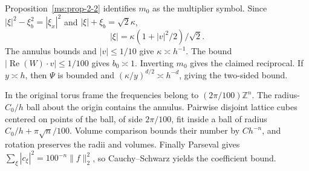 Proposition~\ref{ms:prop-2-2} identifies $m_0$ as the multiplier symbol. Since $|\xi|^2-\xi_b^2=|\xi_x|^2$ and $|\xi|+\xi_b=\sqrt2\kappa$,
\[
 |\xi|=\kappa(1+|v|^2/2)/\sqrt2 .
\]
The annulus bounds and $|v|\le1/10$ give $\kappa\asymp h^{-1}$. The bound $|\operatorname{Re}(W)\cdot v|\le1/100$ gives $b_0\asymp1$. Inverting $m_0$ gives the claimed reciprocal. If $y\asymp h$, then $\Psi$ is bounded and $(\kappa/y)^{d/2}\asymp h^{-d}$, giving the two-sided bound.

In the original torus frame the frequencies belong to $(2\pi/100)\mathbb Z^n$. The radius-$C_0/h$ ball about the origin contains the annulus. Pairwise disjoint lattice cubes centered on points of the ball, of side $2\pi/100$, fit inside a ball of radius $C_0/h+\pi\sqrt n/100$. Volume comparison bounds their number by $Ch^{-n}$, and rotation preserves the radii and volumes. Finally Parseval gives $\sum_\xi|c_\xi|^2=100^{-n}\|f\|_2^2$, so Cauchy--Schwarz yields the coefficient bound.
